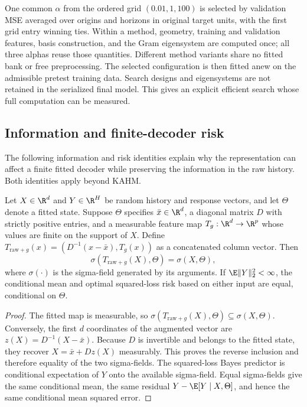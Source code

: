 One common $\alpha$ from the ordered grid $(0.01,1,100)$ is selected by validation MSE averaged
over origins and horizons in original target units, with the first grid
entry winning ties.  Within a method, geometry, training and validation
features, basis construction, and the Gram eigensystem are computed once;
all three alphas reuse those quantities.  Different method variants share
no fitted bank or free preprocessing.  The selected configuration is then
fitted anew on the admissible pretest training data.  Search designs and
eigensystems are not retained in the serialized final model.  This gives
an explicit efficient search whose full computation can be measured.

\subsection{Information and finite-decoder risk}
\label{sec:nf-information}

The following information and risk identities explain why the
representation can affect a finite fitted decoder while preserving the
information in the raw history. Both identities apply beyond KAHM.

\begin{proposition}
\label{prop:nf-raw-preservation}
Let $X\in\R^d$ and $Y\in\R^H$ be random history and response vectors,
and let $\Theta$ denote a fitted state. Suppose $\Theta$ specifies
$\bar x\in\R^d$, a diagonal matrix $D$ with strictly positive entries,
and a measurable feature map $T_g:\R^d\to\R^p$ whose values are finite
on the support of $X$. Define
$T_{\mathrm{raw}+g}(x)=(D^{-1}(x-\bar x),T_g(x))$ as a concatenated
column vector. Then
\[
 \sigma(T_{\mathrm{raw}+g}(X),\Theta)=\sigma(X,\Theta),
\]
where $\sigma(\cdot)$ is the sigma-field generated by its arguments.
If $\E\|Y\|_2^2<\infty$, the conditional mean and optimal squared-loss
risk based on either input are equal, conditional on $\Theta$.
\end{proposition}
\begin{proof}
The fitted map is measurable, so
$\sigma(T_{\mathrm{raw}+g}(X),\Theta)\subseteq\sigma(X,\Theta)$.
Conversely, the first $d$ coordinates of the augmented vector are
$z(X)=D^{-1}(X-\bar x)$. Because $D$ is invertible and belongs to the
fitted state, they recover $X=\bar x+Dz(X)$ measurably. This proves the
reverse inclusion and therefore equality of the two sigma-fields.
The squared-loss Bayes predictor is conditional expectation of $Y$
onto the available sigma-field. Equal sigma-fields give the same
conditional mean, the same residual $Y-\E[Y\mid X,\Theta]$, and hence
the same conditional mean squared error.
\end{proof}

